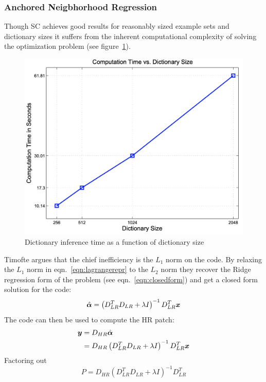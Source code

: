 \subsubsection{Anchored Neigbhorhood Regression}
Though SC achieves good results for reasonably sized example sets and dictionary sizes it suffers from the inherent computational complexity of solving the optimization problem (see figure~\ref{fig:dictspeedspize}).
\begin{figure}
    \centering
    \includegraphics[width=\linewidth,keepaspectratio]{figures/dictsizespeed.png}
    \caption{Dictionary inference time as a function of dictionary size\cite{yang2010}}
    \label{fig:dictspeedspize}
\end{figure}
%
Timofte \etal\cite{Timofte} argues that the chief inefficiency is the $L_1$ norm on the code.
%
By relaxing the $L_1$ norm in eqn.~\eqref{eqn:lagrangerepr} to the $L_2$ norm they recover the Ridge regression form of the problem (see eqn.~\eqref{eqn:closedform}) and get a closed form solution for the code:
\begin{equation}
    \hat{\bm{\alpha}} = \left( D_{LR}^T D_{LR} + \lambda I\right)^{-1}D_{LR}^T \bm{x}
\end{equation}
The code can then be used to compute the HR patch:
\begin{align}
    \by &= D_{HR} \hat{\bm{\alpha}} \\
    &= D_{HR} \left( D_{LR}^T D_{LR} + \lambda I\right)^{-1}D_{LR}^T \label{eqn:mappinglr}\bx
\end{align}
Factoring out
\begin{equation}
    P = D_{HR} \left( D_{LR}^T D_{LR} + \lambda I\right)^{-1}D_{LR}^T
\end{equation}
